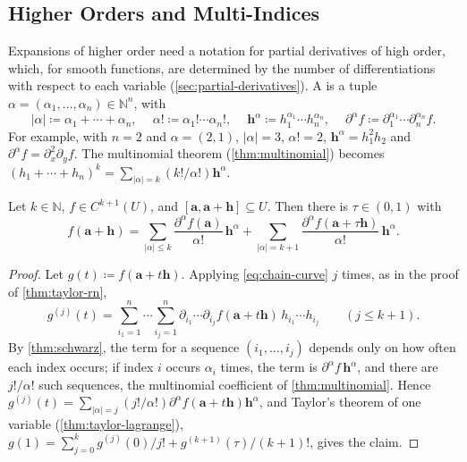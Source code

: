 \subsection{Higher Orders and Multi-Indices}

Expansions of higher order need a notation for partial derivatives of high order, which, for smooth functions, are determined by the number of differentiations with respect to each variable (\cref{sec:partial-derivatives}). A  is a tuple $\alpha=(\alpha_1,\ldots,\alpha_n)\in\mathbb N^n$, with
\[
|\alpha|\coloneqq\alpha_1+\cdots+\alpha_n,\quad\ \alpha!\coloneqq\alpha_1!\cdots\alpha_n!,\quad\ \mathbf h^\alpha\coloneqq h_1^{\alpha_1}\cdots h_n^{\alpha_n},\quad\ \partial^\alpha f\coloneqq\partial_1^{\alpha_1}\cdots\partial_n^{\alpha_n}f .
\]
For example, with $n=2$ and $\alpha=(2,1)$, $|\alpha|=3$, $\alpha!=2$, $\mathbf h^\alpha=h_1^2h_2$ and $\partial^\alpha f=\partial_x^2\partial_yf$. The multinomial theorem (\cref{thm:multinomial}) becomes $(h_1+\cdots+h_n)^k=\sum_{|\alpha|=k}(k!/\alpha!)\mathbf h^\alpha$.

\begin{theorem}
\label{thm:taylor-multi}
Let $k\in\mathbb N$, $f\in C^{k+1}(U)$, and $[\mathbf a,\mathbf a+\mathbf h]\subseteq U$. Then there is $\tau\in(0,1)$ with
\[
f(\mathbf a+\mathbf h)=\sum_{|\alpha|\le k}\frac{\partial^\alpha f(\mathbf a)}{\alpha!}\,\mathbf h^\alpha+\sum_{|\alpha|=k+1}\frac{\partial^\alpha f(\mathbf a+\tau\mathbf h)}{\alpha!}\,\mathbf h^\alpha .
\]
\end{theorem}

\begin{proof}
Let $g(t)\coloneqq f(\mathbf a+t\mathbf h)$. Applying \eqref{eq:chain-curve} $j$ times, as in the proof of \cref{thm:taylor-rn},
\[
g^{(j)}(t)=\sum_{i_1=1}^n\cdots\sum_{i_j=1}^n\partial_{i_1}\cdots\partial_{i_j}f(\mathbf a+t\mathbf h)\,h_{i_1}\cdots h_{i_j}\qquad(j\le k+1).
\]
By \cref{thm:schwarz}, the term for a sequence $(i_1,\ldots,i_j)$ depends only on how often each index occurs; if index $i$ occurs $\alpha_i$ times, the term is $\partial^\alpha f\,\mathbf h^\alpha$, and there are $j!/\alpha!$ such sequences, the multinomial coefficient of \cref{thm:multinomial}. Hence $g^{(j)}(t)=\sum_{|\alpha|=j}(j!/\alpha!)\partial^\alpha f(\mathbf a+t\mathbf h)\mathbf h^\alpha$, and Taylor's theorem of one variable (\cref{thm:taylor-lagrange}), $g(1)=\sum_{j=0}^kg^{(j)}(0)/j!+g^{(k+1)}(\tau)/(k+1)!$, gives the claim.
\end{proof}

